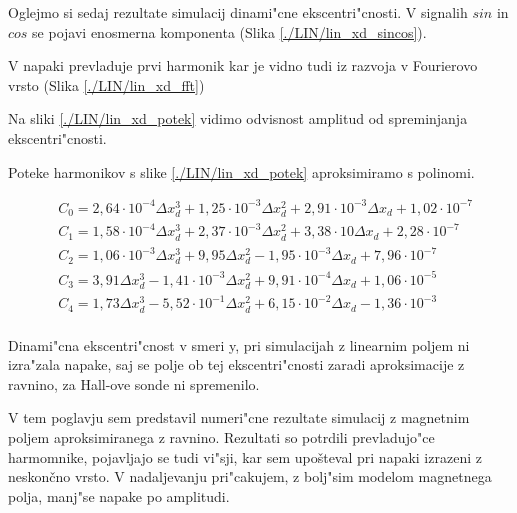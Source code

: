Oglejmo si sedaj rezultate simulacij dinami"cne ekscentri"cnosti. V signalih $sin$ in $cos$ se pojavi enosmerna komponenta (Slika \ref{./LIN/lin_xd_sincos}).


V napaki prevladuje prvi harmonik kar je vidno tudi iz razvoja v Fourierovo vrsto (Slika \ref{./LIN/lin_xd_fft})




Na sliki \ref{./LIN/lin_xd_potek} vidimo odvisnost amplitud od spreminjanja ekscentri"cnosti.


Poteke harmonikov s slike \ref{./LIN/lin_xd_potek} aproksimiramo  s polinomi. 

\begin{eqnarray}
&C_0 =2,64\cdot 10^{-4}\Delta x_d^{3}+1,25\cdot 10^{-3}\Delta x_d^{2}+2,91\cdot 10^{-3}\Delta x_d+1,02\cdot 10^{-7} \\
&C_1 =1,58\cdot 10^{-4}\Delta x_d^{3}+2,37\cdot 10^{-3}\Delta x_d^{2}+3,38\cdot 10\Delta x_d+2,28\cdot 10^{-7} \\     
&C_2 =1,06\cdot 10^{-3}\Delta x_d^{3}+9,95\Delta x_d^{2}-1,95\cdot 10^{-3}\Delta x_d+7,96\cdot 10^{-7} \\             
&C_3 =3,91\Delta x_d^{3}-1,41\cdot 10^{-3}\Delta x_d^{2}+9,91\cdot 10^{-4}\Delta x_d+1,06\cdot 10^{-5} \\             
&C_4 =1,73\Delta x_d^{3}-5,52\cdot 10^{-1}\Delta x_d^{2}+6,15\cdot 10^{-2}\Delta x_d-1,36\cdot 10^{-3} \\           
\end{eqnarray}

Dinami"cna ekscentri"cnost v smeri y, pri simulacijah z linearnim poljem ni izra"zala napake, saj se polje ob tej ekscentri"cnosti zaradi aproksimacije z ravnino, za Hall-ove sonde ni spremenilo.

V tem poglavju sem predstavil numeri"cne rezultate simulacij z magnetnim poljem aproksimiranega z ravnino. Rezultati so potrdili prevladujo"ce harmomnike, pojavljajo se tudi vi"sji, kar sem upošteval pri napaki izrazeni z neskončno vrsto. V nadaljevanju pri"cakujem, z bolj"sim modelom magnetnega polja, manj"se napake po amplitudi.


